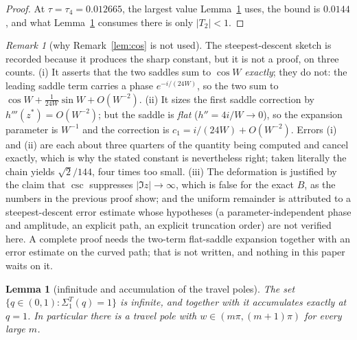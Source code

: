 \documentclass[11pt]{article}
\theoremstyle{plain}
\newtheorem{lemma}[theorem]{Lemma}
\theoremstyle{definition}
\theoremstyle{remark}
\newtheorem{remark}[theorem]{Remark}
\begin{document}
\begin{proof}
At $\tau=\tau_4=0.012665$, the largest value Lemma~\ref{lem:infpoles} uses, the bound is $0.0144$,
and what Lemma~\ref{lem:infpoles} consumes there is only $|T_2|<1$.
\end{proof}

\begin{remark}[why Remark~\ref{lem:cos} is not used]\label{rem:cosgap}
The steepest-descent sketch is recorded because it produces the sharp constant, but it is not a
proof, on three counts. (i) It asserts that the two saddles sum to $\cos W$ \emph{exactly}; they do
not: the leading saddle term carries a phase $e^{-i/(24W)}$, so the two sum to
$\cos W+\tfrac1{24W}\sin W+O(W^{-2})$. (ii) It sizes the first saddle correction by
$h'''(z^\ast)=O(W^{-2})$; but the saddle is \emph{flat} ($h''=4i/W\to0$), so the expansion parameter
is $W^{-1}$ and the correction is $c_1=i/(24W)+O(W^{-2})$. Errors (i) and (ii) are each about
three quarters of the quantity being computed and cancel exactly, which is why the stated constant
is nevertheless right; taken literally the chain yields $\sqrt2/144$, four times too small.
(iii) The deformation is justified by the claim that $\csc$ suppresses $|\Im z|\to\infty$, which is
false for the exact $B$, as the numbers in the previous proof show; and the uniform remainder is
attributed to a steepest-descent error estimate whose hypotheses (a parameter-independent phase and
amplitude, an explicit path, an explicit truncation order) are not verified here. A complete proof
needs the two-term flat-saddle expansion together with an error estimate on the curved path; that is
not written, and nothing in this paper waits on it.
\end{remark}

\begin{lemma}[infinitude and accumulation of the travel poles]\label{lem:infpoles}
The set $\{q\in(0,1):\Sigma_1^T(q)=1\}$ is infinite, and together with
{\cite[Lemma ``The travel poles are locally finite'', \textup{lem:polefinite}]{Bonfioli2026bA}} it accumulates exactly at $q=1$. In particular there is a travel pole
with $w\in(m\pi,(m+1)\pi)$ for every large $m$.
\end{lemma}
\end{document}
